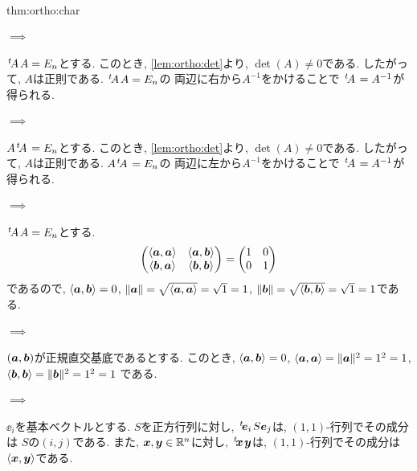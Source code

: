 \begin{proofof}{thm:ortho:char}
  \paragraph{$\implies$}
  ${\left.^{t}\!A\right.}A=E_n$とする.
  このとき, \cref{lem:ortho:det}より,
  $\det(A)\neq 0$である.
  したがって, $A$は正則である.
  ${\left.^{t}\!A\right.}A=E_n$の
  両辺に右から$A^{-1}$をかけることで
  ${\left.^{t}\!A\right.}=A^{-1}$が得られる.

  \paragraph{$\implies$}
  $A{\left.^{t}\!A\right.}=E_n$とする.
  このとき, \cref{lem:ortho:det}より,
  $\det(A)\neq 0$である.
  したがって, $A$は正則である.
  $A{\left.^{t}\!A\right.}=E_n$の
  両辺に左から$A^{-1}$をかけることで
  ${\left.^{t}\!A\right.}=A^{-1}$が得られる.

  \paragraph{$\implies$}
  ${\left.^{t}\!A\right.}A=E_n$とする.
  \begin{align*}
    \begin{pmatrix}
      \Braket{\boldsymbol{a},\boldsymbol{a}}&\Braket{\boldsymbol{a},\boldsymbol{b}}\\
      \Braket{\boldsymbol{b},\boldsymbol{a}}&\Braket{\boldsymbol{b},\boldsymbol{b}}
    \end{pmatrix}=
    \begin{pmatrix}
      1&0\\
      0&1
    \end{pmatrix}
  \end{align*}
  であるので, 
  $\Braket{\boldsymbol{a},\boldsymbol{b}}=0$, $\|\boldsymbol{a}\|=\sqrt{\Braket{\boldsymbol{a},\boldsymbol{a}}}=\sqrt{1}=1$,
  $\|\boldsymbol{b}\|=\sqrt{\Braket{\boldsymbol{b},\boldsymbol{b}}}=\sqrt{1}=1$である.
  \paragraph{$\implies$}
  $(\boldsymbol{a},\boldsymbol{b})$が正規直交基底であるとする.
  このとき,
  $\Braket{\boldsymbol{a},\boldsymbol{b}}=0$,
  $\Braket{\boldsymbol{a},\boldsymbol{a}}=\|\boldsymbol{a}\|^2=1^2=1$,
  $\Braket{\boldsymbol{b},\boldsymbol{b}}=\|\boldsymbol{b}\|^2=1^2=1$
  である.
  


  \paragraph{$\implies$}
  $\ee_i$を基本ベクトルとする.
  $S$を正方行列に対し,
  ${\left.^{t}\!\boldsymbol{e}_{i}\right.}S\boldsymbol{e}_{j}$は,
  $(1,1)$-行列でその成分は
  $S$の$(i,j)$である.
  また, $\boldsymbol{x},\boldsymbol{y}\in\mathbb{R}^n$に対し,
  ${\left.^{t}\!\boldsymbol{x}\right.}\boldsymbol{y}$は, $(1,1)$-行列でその成分は
  $\Braket{\boldsymbol{x},\boldsymbol{y}}$である.


\end{proofof}
